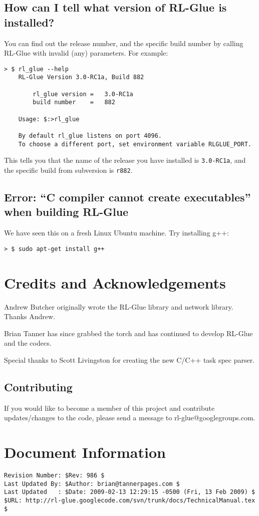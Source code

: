 \documentclass[11pt]{article}
\begin{document}
\subsection{How can I tell what version of RL-Glue is installed?}
You can find out the release number, and the specific build number by 
calling RL-Glue with invalid (any) parameters.  For example:
\begin{verbatim}
> $ rl_glue --help
    RL-Glue Version 3.0-RC1a, Build 882

        rl_glue version	=	3.0-RC1a
        build number	=	882

    Usage: $:>rl_glue

    By default rl_glue listens on port 4096.
    To choose a different port, set environment variable RLGLUE_PORT.
\end{verbatim}

This tells you that the name of the release you have installed is \texttt{3.0-RC1a}, and the 
specific build from subversion is \texttt{r882}.


\subsection{Error: ``C compiler cannot create executables'' when building RL-Glue}

We have seen this on a fresh Linux Ubuntu machine.  Try installing g++:
\begin{verbatim}
> $ sudo apt-get install g++
\end{verbatim}


\section{Credits and Acknowledgements}
Andrew Butcher originally wrote the RL-Glue library and network library.  Thanks Andrew.

Brian Tanner has since grabbed the torch and has continued to develop RL-Glue and the codecs.

Special thanks to Scott Livingston for creating the new C/C++ task spec parser.

\subsection{Contributing}
If you would like to become a member of this project and contribute updates/changes to the code, please send a message to rl-glue@googlegroups.com.


\section*{Document Information}
\begin{verbatim}
Revision Number: $Rev: 986 $
Last Updated By: $Author: brian@tannerpages.com $
Last Updated   : $Date: 2009-02-13 12:29:15 -0500 (Fri, 13 Feb 2009) $
$URL: http://rl-glue.googlecode.com/svn/trunk/docs/TechnicalManual.tex $
\end{verbatim}
\end{document}
